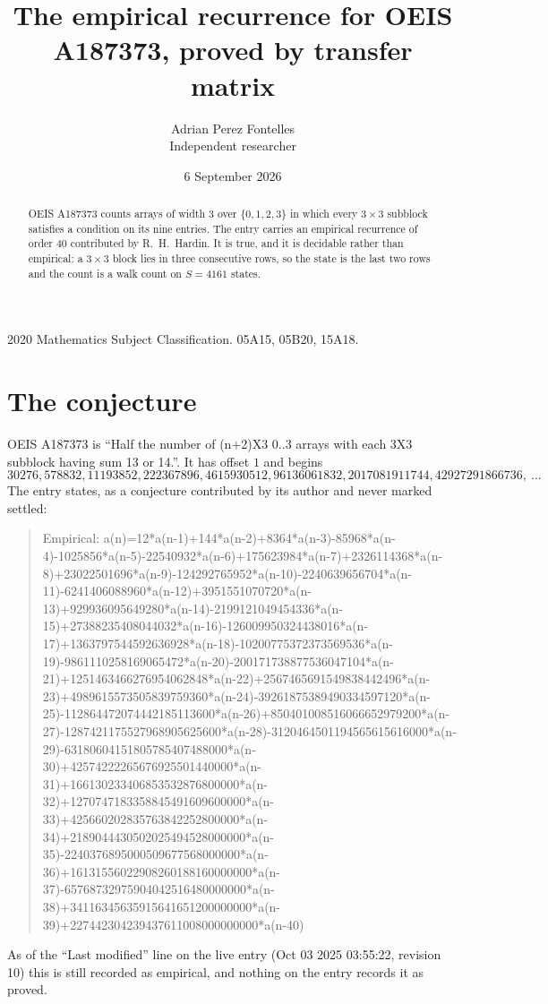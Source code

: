 \documentclass[11pt,a4paper]{article}
\title{The empirical recurrence for OEIS A187373, proved by transfer matrix}
\author{Adrian Perez Fontelles\\ \small Independent researcher}
\date{6 September 2026}
\theoremstyle{plain}
\theoremstyle{definition}
\begin{document}
\maketitle

\begin{abstract}
OEIS A187373 counts arrays of width $3$ over $\{0,1,2,3\}$ in which every $3\times3$ subblock
satisfies a condition on its nine entries. The entry carries an empirical recurrence of order
$40$ contributed by R.~H.~Hardin. It is true, and it is decidable rather than empirical: a
$3\times3$ block lies in three consecutive rows, so the state is the last two rows and the
count is a walk count on $S=4161$ states.
\end{abstract}

\noindent\small 2020 Mathematics Subject Classification. 05A15, 05B20, 15A18.\normalsize

\section{The conjecture}

OEIS A187373 is ``Half the number of (n+2)X3 0..3 arrays with each 3X3 subblock having sum 13 or 14.''. It has offset $1$ and begins
\[
30276, 578832, 11193852, 222367896, 4615930512, 96136061832, 2017081911744, 42927291866736,\ \dots
\]
The entry states, as a conjecture contributed by its author and never marked settled:
\begin{quote}
Empirical: a(n)=12*a(n-1)+144*a(n-2)+8364*a(n-3)-85968*a(n-4)-1025856*a(n-5)-22540932*a(n-6)+175623984*a(n-7)+2326114368*a(n-8)+23022501696*a(n-9)-124292765952*a(n-10)-2240639656704*a(n-11)-6241406088960*a(n-12)+3951551070720*a(n-13)+929936095649280*a(n-14)-2199121049454336*a(n-15)+27388235408044032*a(n-16)-126009950324438016*a(n-17)+1363797544592636928*a(n-18)-10200775372373569536*a(n-19)-9861110258169065472*a(n-20)-200171738877536047104*a(n-21)+1251463466276954062848*a(n-22)+2567465691549838442496*a(n-23)+4989615573505839759360*a(n-24)-39261875389490334597120*a(n-25)-112864472074442185113600*a(n-26)+850401008516066652979200*a(n-27)-1287421175527968905625600*a(n-28)-3120464501194565615616000*a(n-29)-63180604151805785407488000*a(n-30)+42574222265676925501440000*a(n-31)+166130233406853532876800000*a(n-32)+1270747183358845491609600000*a(n-33)+425660202835763842252800000*a(n-34)+2189044430502025494528000000*a(n-35)-2240376895000509677568000000*a(n-36)+16131556022908260188160000000*a(n-37)-65768732975904042516480000000*a(n-38)+34116345635915641651200000000*a(n-39)+227442304239437611008000000000*a(n-40)
\end{quote}
As of the ``Last modified'' line on the live entry (Oct 03 2025 03:55:22, revision 10) this is still
recorded as empirical, and nothing on the entry records it as proved.
\end{document}
